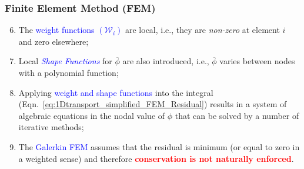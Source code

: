 \documentclass[10pt,compress]{beamer}
\begin{document}
 
\begin{frame}
 \frametitle{Finite Element Method (FEM)} 

\begin{enumerate}
   \setcounter{enumi}{5}
     \item <1-> The \textcolor{blue}{weight functions $\left(\mathcal{W}_{i}\right)$} are local, i.e., they are {\it non-zero} at element $i$ and zero elsewhere;
     \item <2-> Local \textcolor{blue}{\it Shape Functions} for $\overline{\phi}$ are also introduced, i.e., $\overline{\phi}$ varies between nodes with a polynomial function;
     \item <3-> Applying \textcolor{blue}{weight and shape functions} into the integral (Eqn.~\ref{eq:1Dtransport_simplified_FEM_Residual}) results in a system of algebraic equations in the nodal value of $\phi$ that can be solved by a number of iterative methods;
     \item <4-> The \textcolor{blue}{Galerkin FEM} assumes that the residual is minimum (or equal to zero in a weighted sense) and therefore \textcolor{red}{{\bf conservation is not naturally enforced}}.

\end{enumerate}  
 
\end{frame}
\end{document}
